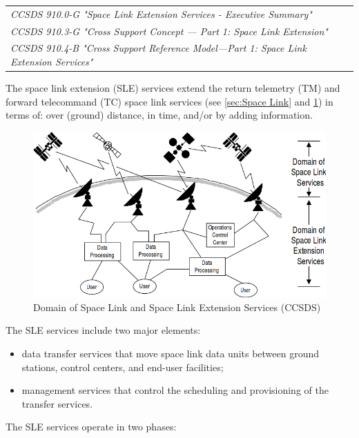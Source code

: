 \begin{tabular}{l}
\textit{CCSDS 910.0-G "Space Link Extension Services - Executive Summary" \cite{CCSDS-910.0-G}} \\
\textit{CCSDS 910.3-G "Cross Support Concept — Part 1:  Space Link Extension" \cite{CCSDS-910.3-G}} \\
\textit{CCSDS 910.4-B "Cross Support Reference Model—Part 1: Space Link Extension Services" \cite{CCSDS-910.4-B}} \\
\end{tabular}

The space link extension (SLE) services extend the return telemetry (TM) and forward telecommand (TC) space link services (see \ref{sec:Space Link} and \ref{fig:Domain of Space Link and Space Link Extension Services}) in terms of: over (ground) distance, in time, and/or by adding information.

\begin{figure}[h]
\centering\includegraphics[scale=0.5]{fig/domains_of_space_link_and_space_link_extension_services}
\caption{Domain of Space Link and Space Link Extension Services (CCSDS)}
\label{fig:Domain of Space Link and Space Link Extension Services}
\end{figure}

The SLE services include two major elements:

\begin{itemize}
\item data transfer services that move space link data units between ground stations, control centers, and end-user facilities;
\item management services that control the scheduling and provisioning of the transfer services.
\end{itemize}

The SLE services operate in two phases:

